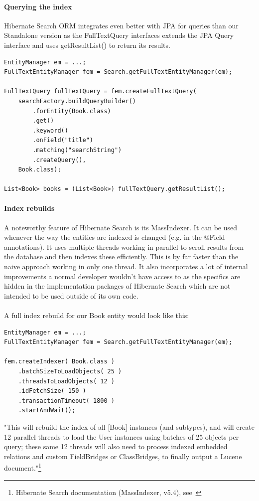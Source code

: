 \paragraph{Querying the index} \label{hsearch_orm_querying}
Hibernate Search ORM integrates even better with JPA for queries than our Standalone version as the FullTextQuery interfaces extends the JPA Query interface and uses getResultList() to return its results.
\\
\lstset{language=java}
\begin{lstlisting}[frame=htrbl, caption={Querying with Hibernate Search ORM}, label={lst:querying_hsearch_orm.java_1}]
EntityManager em = ...;
FullTextEntityManager fem = Search.getFullTextEntityManager(em);

FullTextQuery fullTextQuery = fem.createFullTextQuery(
	searchFactory.buildQueryBuilder()
		.forEntity(Book.class)
		.get()
		.keyword()
		.onField("title")
		.matching("searchString")
		.createQuery(), 
	Book.class);
	
List<Book> books = (List<Book>) fullTextQuery.getResultList();
\end{lstlisting}

\paragraph{Index rebuilds}
A noteworthy feature of Hibernate Search is its MassIndexer. It can be used whenever the way the entities are indexed is changed (e.g. in the @Field annotations). It uses multiple threads working in parallel to scroll results from the database and then indexes these efficiently. This is by far faster than the naive approach working in only one thread. It also incorporates a lot of internal improvements a normal developer wouldn't have access to as the specifics are hidden in the implementation packages of Hibernate Search which are not intended to be used outside of its own code.
\\\\
A full index rebuild for our Book entity would look like this:
\\
\lstset{language=java}
\begin{lstlisting}[frame=htrbl, caption={MassIndexer usage with Hibernate Search ORM}, label={lst:massindexing_hsearch_orm.java}]
EntityManager em = ...;
FullTextEntityManager fem = Search.getFullTextEntityManager(em);

fem.createIndexer( Book.class )
	.batchSizeToLoadObjects( 25 )
	.threadsToLoadObjects( 12 )
	.idFetchSize( 150 )
	.transactionTimeout( 1800 )
	.startAndWait();
\end{lstlisting}
\noindent
"This will rebuild the index of all [Book] instances (and subtypes), and will create 12 parallel threads to load the User instances using batches of 25 objects per query; these same 12 threads will also need to process indexed embedded relations and custom FieldBridges or ClassBridges, to finally output a Lucene document."\footnote{Hibernate Search documentation (MassIndexer, v5.4), see~\cite{hibernate_search_doc_massindexer}}

